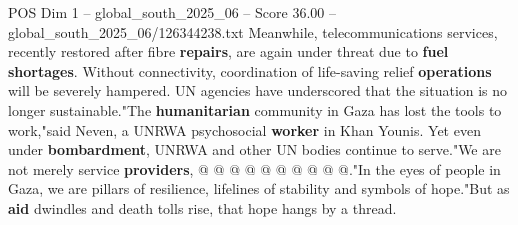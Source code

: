 \begin{textsample}{POS Dim 1 – global\_south\_2025\_06 – Score 36.00 – global\_south\_2025\_06/126344238.txt}
Meanwhile, telecommunications services, recently restored after fibre \textbf{repairs}, are again under threat due to \textbf{fuel} \textbf{shortages}.
Without connectivity, coordination of life-saving relief \textbf{operations} will be severely hampered.
UN agencies have underscored that the situation is no longer sustainable."The \textbf{humanitarian} community in Gaza has lost the tools to work,"said Neven, a UNRWA psychosocial \textbf{worker} in Khan Younis.
Yet even under \textbf{bombardment}, UNRWA and other UN bodies continue to serve."We are not merely service \textbf{providers}, @ @ @ @ @ @ @ @ @ @."In the eyes of people in Gaza, we are pillars of resilience, lifelines of stability and symbols of hope."But as \textbf{aid} dwindles and death tolls rise, that hope hangs by a thread.

\end{textsample}
